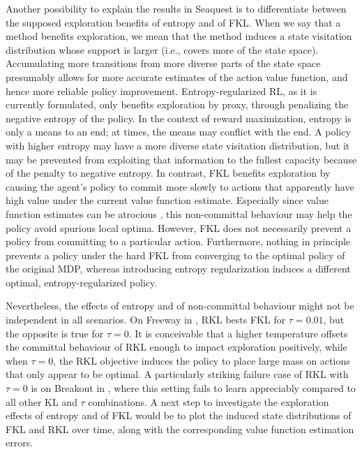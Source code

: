 \documentclass[\main/thesis.tex]{subfiles}
\begin{document}
Another possibility to explain the results in Seaquest is to differentiate between the supposed exploration benefits of entropy and of FKL. When we say that a method benefits exploration, we mean that the method induces a state visitation distribution whose support is larger (i.e., covers more of the state space). Accumulating more transitions from more diverse parts of the state space presumably allows for more accurate estimates of the action value function, and hence more reliable policy improvement. Entropy-regularized RL, as it is currently formulated, only benefits exploration by proxy, through penalizing the negative entropy of the policy. In the context of reward maximization, entropy is only a means to an end; at times, the means may conflict with the end. A policy with higher entropy may have a more diverse state visitation distribution, but it may be prevented from exploiting that information to the fullest capacity because of the penalty to negative entropy. In contrast, FKL benefits exploration by causing the agent's policy to commit more slowly to actions that apparently have high value under the current value function estimate. Especially since value function estimates can be atrocious \citep{ilyas2018deep}, this non-committal behaviour may help the policy avoid spurious local optima. However, FKL does not necessarily prevent a policy from committing to a particular action. Furthermore, nothing in principle prevents a policy under the hard FKL from converging to the optimal policy of the original MDP, whereas introducing entropy regularization induces a different optimal, entropy-regularized policy. 

Nevertheless, the effects of entropy and of non-committal behaviour might not be independent in all scenarios. On Freeway in , RKL bests FKL for $\tau = 0.01$, but the opposite is true for $\tau = 0$. It is conceivable that a higher temperature offsets the committal behaviour of RKL enough to impact exploration positively, while when $\tau = 0$, the RKL objective induces the policy to place large mass on actions that only appear to be optimal. A particularly striking failure case of RKL with $\tau = 0$ is on Breakout in , where this setting fails to learn appreciably compared to all other KL and $\tau$ combinations. A next step to investigate the exploration effects of entropy and of FKL would be to plot the induced state distributions of FKL and RKL over time, along with the corresponding value function estimation errors. 
\end{document}
